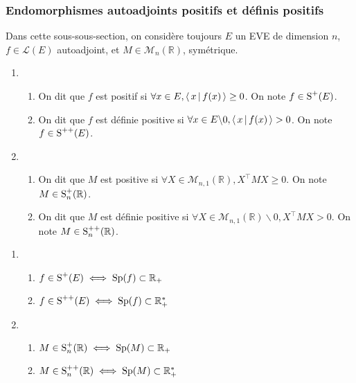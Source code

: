     \subsubsection{Endomorphismes autoadjoints positifs et définis positifs}

    Dans cette sous-sous-section, on considère toujours $E$ un EVE de dimension $n$, $f \in \mathcal{L}(E)$ autoadjoint, et $M \in \mathcal{M}_n(\mathbb{R})$, symétrique.

    \begin{defi}{}{}
        \begin{enumerate}
            \item \begin{enumerate}
            \item On dit que $f$ est positif si $\forall x \in E, \left<\,x\,\middle|\,f(x)\,\right> \geq 0$. On note $f \in \operatorname{S}^+(E)$.
            \item On dit que $f$ est définie positive si $\forall x \in E \backslash {0}, \left<\,x\,\middle|\,f(x)\,\right> > 0$. On note $f \in \operatorname{S}^{++}(E)$.
        \end{enumerate} 
            \item \begin{enumerate}
            \item On dit que $M$ est positive si $\forall X \in \mathcal{M}_{n,1}(\mathbb{R}), X^{\top} M X \geq 0$. On note $M \in \operatorname{S}_n^{+}(\mathbb{R})$.
            \item On dit que $M$ est définie positive si $\forall X \in \mathcal{M}_{n,1}(\mathbb{R}) \backslash {0}, X^{\top} M X > 0$. On note $M \in \operatorname{S}_n^{++}(\mathbb{R})$.
        \end{enumerate}
        \end{enumerate}
    \end{defi}

    \begin{prop}{}{}
        \begin{enumerate}
            \item \begin{enumerate}
                \item $f \in \operatorname{S}^+(E) \iff \operatorname{Sp}(f) \subset \mathbb{R}_+$
                \item $f \in \operatorname{S}^{++}(E) \iff \operatorname{Sp}(f) \subset \mathbb{R}_+^*$
            \end{enumerate}
            \item \begin{enumerate}
                \item $M \in \operatorname{S}_n^+(\mathbb{R}) \iff \operatorname{Sp}(M) \subset \mathbb{R}_+$
                \item $M \in \operatorname{S}_n^{++}(\mathbb{R}) \iff \operatorname{Sp}(M) \subset \mathbb{R}_+^*$
            \end{enumerate}
        \end{enumerate}
    \end{prop}

